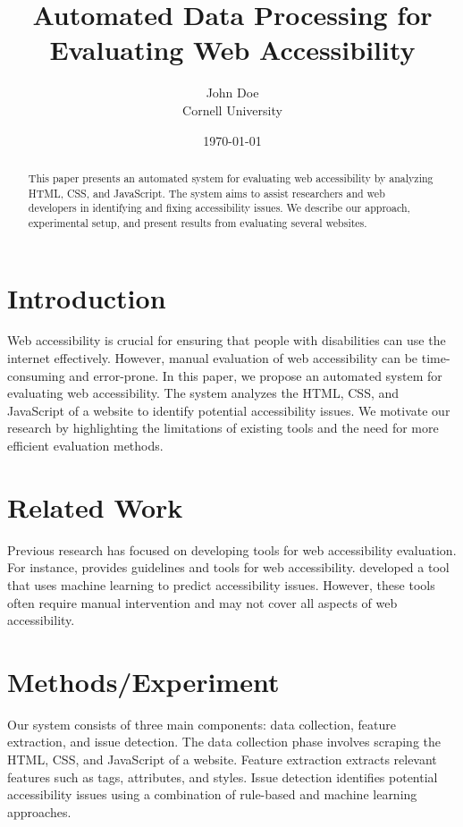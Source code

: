 \documentclass{article}
\title{Automated Data Processing for Evaluating Web Accessibility}
\author{John Doe \\ Cornell University}
\date{\today}
\begin{document}
\maketitle

\begin{abstract}
This paper presents an automated system for evaluating web accessibility by analyzing HTML, CSS, and JavaScript. The system aims to assist researchers and web developers in identifying and fixing accessibility issues. We describe our approach, experimental setup, and present results from evaluating several websites.
\end{abstract}

\section{Introduction}
Web accessibility is crucial for ensuring that people with disabilities can use the internet effectively. However, manual evaluation of web accessibility can be time-consuming and error-prone. In this paper, we propose an automated system for evaluating web accessibility. The system analyzes the HTML, CSS, and JavaScript of a website to identify potential accessibility issues. We motivate our research by highlighting the limitations of existing tools and the need for more efficient evaluation methods.

\section{Related Work}
Previous research has focused on developing tools for web accessibility evaluation. For instance, \cite{W3C2019} provides guidelines and tools for web accessibility. \cite{Shah2018} developed a tool that uses machine learning to predict accessibility issues. However, these tools often require manual intervention and may not cover all aspects of web accessibility.

\section{Methods/Experiment}
Our system consists of three main components: data collection, feature extraction, and issue detection. The data collection phase involves scraping the HTML, CSS, and JavaScript of a website. Feature extraction extracts relevant features such as tags, attributes, and styles. Issue detection identifies potential accessibility issues using a combination of rule-based and machine learning approaches.
\end{document}
